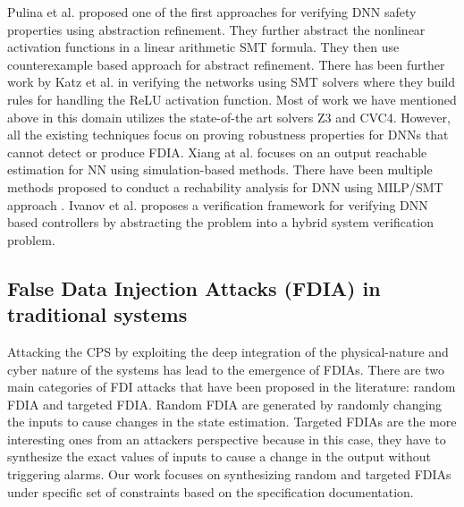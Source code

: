 Pulina et al.\cite{10.1007/978-3-642-14295-6_24} proposed one of the first approaches for verifying DNN safety properties using abstraction refinement. They further abstract \cite{article} the nonlinear activation functions in a linear arithmetic SMT formula. They then use counterexample based approach for abstract refinement. There has been further work by Katz et al.\cite{10.1007/978-3-319-63387-9_5} in verifying the networks using SMT solvers where they build rules for handling the ReLU activation function. Most of work we have mentioned above in this domain utilizes the state-of-the art solvers Z3 and CVC4. However, all the existing techniques focus on proving robustness properties \cite{NIPS2016_6339} for DNNs that cannot detect or produce FDIA. Xiang at al.\cite{xiang2017output} focuses on an output reachable estimation for NN using simulation-based methods. There have been multiple methods proposed to conduct a rechability analysis for DNN using MILP/SMT approach \cite{10.1145/3302504.3313351} \cite{ehlers2017formal} \cite{10.1007/978-3-319-63387-9_5} \cite{lomuscio2017approach} \cite{article}. Ivanov et al. \cite{ivanov2018verisig} proposes a verification framework for verifying DNN based controllers by abstracting the problem into a hybrid system verification problem.  

\subsection{False Data Injection Attacks (FDIA) in traditional systems}
Attacking the CPS by exploiting the deep integration of the physical-nature and cyber nature of the systems has lead to the emergence of FDIAs. 
There are two main categories of FDI attacks that have been proposed in the literature: random FDIA and targeted FDIA. Random FDIA are generated by randomly changing the inputs to cause changes in the state estimation. Targeted FDIAs are the more interesting ones from an attackers perspective because in this case, they have to synthesize the exact values of inputs to cause a change in the output without triggering alarms. Our work focuses on synthesizing random and targeted FDIAs under specific set of constraints based on the specification documentation. 

